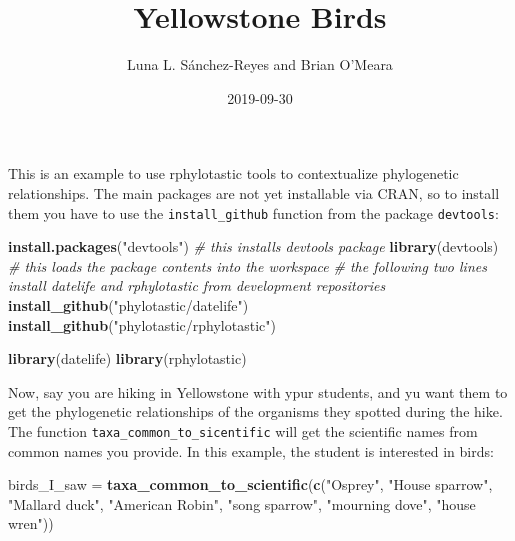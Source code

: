 \documentclass[]{article}
\title{Yellowstone Birds}
\author{Luna L. Sánchez-Reyes and Brian O'Meara}
\date{2019-09-30}
\newenvironment{Shaded}{\begin{snugshade}}{\end{snugshade}}
\newcommand{\CommentTok}[1]{\textcolor[rgb]{0.56,0.35,0.01}{\textit{#1}}}
\newcommand{\KeywordTok}[1]{\textcolor[rgb]{0.13,0.29,0.53}{\textbf{#1}}}
\newcommand{\NormalTok}[1]{#1}
\newcommand{\StringTok}[1]{\textcolor[rgb]{0.31,0.60,0.02}{#1}}
\begin{document}
\maketitle

This is an example to use rphylotastic tools to contextualize phylogenetic relationships.
The main packages are not yet installable via CRAN, so to install them you have to use the \texttt{install\_github} function from the package \texttt{devtools}:

\begin{Shaded}
\begin{Highlighting}[]
\KeywordTok{install.packages}\NormalTok{(}\StringTok{"devtools"}\NormalTok{) }\CommentTok{# this installs devtools package}
\KeywordTok{library}\NormalTok{(devtools) }\CommentTok{# this loads the package contents into the workspace}
\CommentTok{# the following two lines install datelife and rphylotastic from development repositories}
\KeywordTok{install_github}\NormalTok{(}\StringTok{"phylotastic/datelife"}\NormalTok{) }
\KeywordTok{install_github}\NormalTok{(}\StringTok{"phylotastic/rphylotastic"}\NormalTok{)}
\end{Highlighting}
\end{Shaded}

\begin{Shaded}
\begin{Highlighting}[]
\KeywordTok{library}\NormalTok{(datelife)}
\KeywordTok{library}\NormalTok{(rphylotastic)}
\end{Highlighting}
\end{Shaded}

Now, say you are hiking in Yellowstone with ypur students, and yu want them to get the phylogenetic relationships of the organisms they spotted during the hike.
The function \texttt{taxa\_common\_to\_sicentific} will get the scientific names from common names you provide. In this example, the student is interested in birds:

\begin{Shaded}
\begin{Highlighting}[]
\NormalTok{birds_I_saw =}\StringTok{ }\KeywordTok{taxa_common_to_scientific}\NormalTok{(}\KeywordTok{c}\NormalTok{(}\StringTok{"Osprey"}\NormalTok{, }\StringTok{"House sparrow"}\NormalTok{, }
    \StringTok{"Mallard duck"}\NormalTok{, }\StringTok{"American Robin"}\NormalTok{, }\StringTok{"song sparrow"}\NormalTok{, }\StringTok{"mourning dove"}\NormalTok{, }
    \StringTok{"house wren"}\NormalTok{))}
\end{Highlighting}
\end{Shaded}
\end{document}
